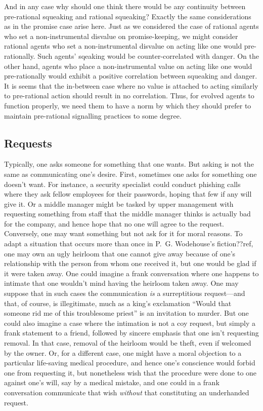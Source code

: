 And in any case why should one think there would be any continuity between pre-rational squeaking and rational squeaking?
Exactly the same considerations as in the promise case arise here. Just as we considered the case of rational
agents who set a non-instrumental disvalue on promise-keeping, we might consider rational agents who set a
non-instrumental disvalue on acting like one would pre-rationally. Such agents' sqeaking would be counter-correlated
with danger. On the other hand, agents who place a non-instrumental value on acting like one would pre-rationally would
exhibit a positive correlation between squeaking and danger. It is seems that the in-between case where
no value is attached to acting similarly to pre-rational action should result in no correlation. Thus, for evolved
agents to function properly, we need them to have a norm by which they should prefer to maintain pre-rational 
signalling practices to some degree. 

\subsection{Requests}
Typically, one asks someone for something that one wants. But asking is not the same as communicating one's desire. First,
sometimes one asks for something one doesn't want. For instance, a security specialist could conduct phishing calls where they
ask fellow employees for their passwords, hoping that few if any will give it. Or a middle manager might be tasked by upper
management with requesting something from staff that the middle manager thinks is actually bad for the company, and hence hope
that no one will agree to the request. Conversely, one may want something but not ask for it for moral reasons. To adapt a 
situation that occurs more than once in P.~G. Wodehouse's fiction??ref, one may own an ugly heirloom that one cannot give away because 
of one's relationship with the person from whom one received it, but one would be glad if it were taken away. One could imagine
a frank conversation where one happens to intimate that one wouldn't mind having the heirloom taken away. One may suppose that
in such cases the communication \textit{is} a surreptitious request---and that, of course, is illegitimate, much as a king's
exclamation ``Would that someone rid me of this troublesome priest'' is an invitation to murder. But one could also imagine
a case where the intimation is not a coy request, but simply a frank statement to a friend, followed by sincere emphasis that one isn't
requesting removal. In that case, removal of the heirloom would be theft, even if welcomed by the owner. Or, for a
different case, one might have a moral objection to a particular life-saving medical procedure, and hence one's conscience would
forbid one from requesting it, but nonetheless wish that the procedure were done to one against one's will, say by a medical
mistake, and one could in a frank conversation communicate that wish \textit{without} that constituting an underhanded request.

